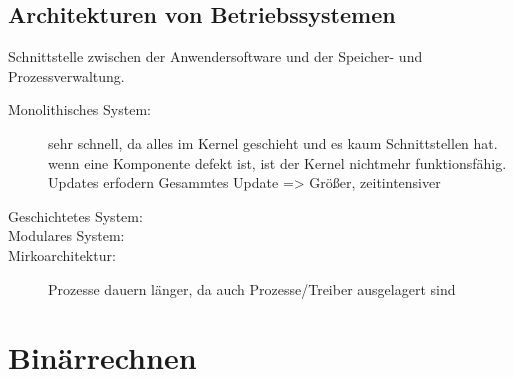 \documentclass[12pt,a4paper]{article}
\begin{document}
	\subsection{Architekturen von Betriebssystemen}
		Schnittstelle zwischen der Anwendersoftware und der Speicher- und Prozessverwaltung.
		\begin{description}
			\item[Monolithisches System:] sehr schnell, da alles im Kernel geschieht und es kaum Schnittstellen hat.
			wenn eine Komponente defekt ist, ist der Kernel nichtmehr funktionsfähig. 
			Updates erfodern Gesammtes Update => Größer, zeitintensiver
			\item[Geschichtetes System:] %
			\item[Modulares System:]  %
			\item[Mirkoarchitektur:] Prozesse dauern länger, da auch Prozesse/Treiber ausgelagert sind
		\end{description}

\section{Binärrechnen}
\end{document}
